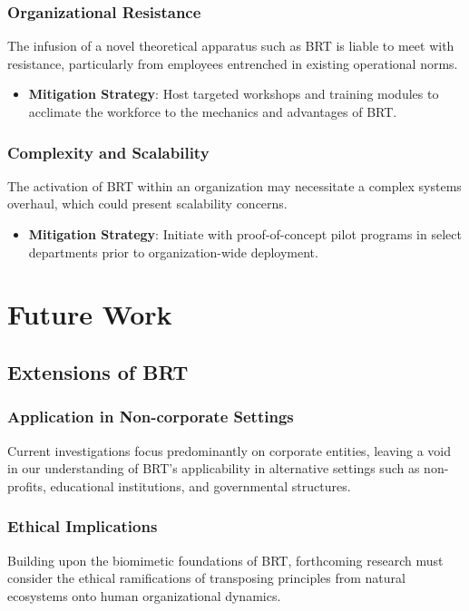 \documentclass[sn-nature]{sn-jnl}%
\newcommand{\sbt}{\,\begin{picture}(-1,1)(-1,-3)\circle*{3}\end{picture}\ }
\theoremstyle{thmstyleone}%
\theoremstyle{thmstyletwo}%
\theoremstyle{thmstylethree}%
\begin{document}
\subsubsection{Organizational Resistance}
The infusion of a novel theoretical apparatus such as BRT is liable to meet with resistance, particularly from employees entrenched in existing operational norms.

\begin{itemize}
    \item[\sbt] \textbf{Mitigation Strategy}: Host targeted workshops and training modules to acclimate the workforce to the mechanics and advantages of BRT.
\end{itemize}

\subsubsection{Complexity and Scalability}
The activation of BRT within an organization may necessitate a complex systems overhaul, which could present scalability concerns.

\begin{itemize}
    \item[\sbt] \textbf{Mitigation Strategy}: Initiate with proof-of-concept pilot programs in select departments prior to organization-wide deployment.
\end{itemize}

\section{Future Work}\label{sec10}

\subsection{Extensions of BRT}

\subsubsection{Application in Non-corporate Settings}
Current investigations focus predominantly on corporate entities, leaving a void in our understanding of BRT's applicability in alternative settings such as non-profits, educational institutions, and governmental structures. 

\subsubsection{Ethical Implications}
Building upon the biomimetic foundations of BRT, forthcoming research must consider the ethical ramifications of transposing principles from natural ecosystems onto human organizational dynamics.
\end{document}
